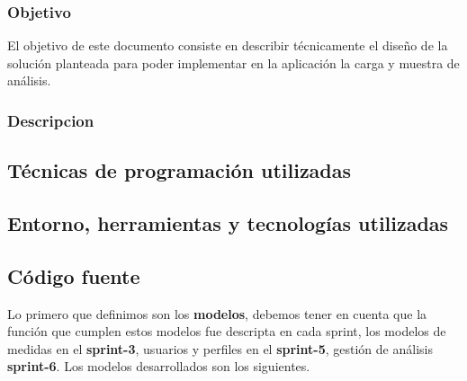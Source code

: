 \documentclass[a4paper,12pt]{article}
\begin{document}
\subsubsection{Objetivo}
El objetivo de este documento consiste en describir técnicamente el diseño de la solución planteada para poder implementar en la aplicación la carga y muestra de análisis.

\subsubsection{Descripcion}%



\subsection{Técnicas de programación utilizadas}
\subsection{Entorno, herramientas y tecnologías utilizadas}
\subsection{Código fuente}

Lo primero que definimos son los \textbf{modelos}, debemos tener en cuenta que la función que cumplen estos modelos fue descripta en cada sprint, los modelos de medidas en el \textbf{sprint-3}, usuarios y perfiles en el \textbf{sprint-5}, gestión de análisis \textbf{sprint-6}. Los modelos desarrollados son los siguientes.
\end{document}
